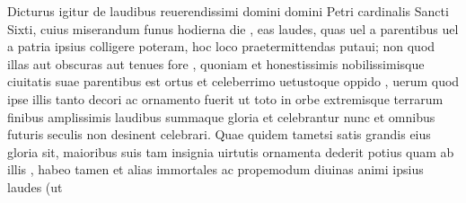 \documentclass[a5paper,twoside]{article}
\begin{document}
Dicturus igitur de laudibus reuerendissimi domini domini Petri cardinalis Sancti Sixti, cuius miserandum funus hodierna die , eas laudes, quas uel a parentibus uel a patria ipsius colligere poteram, hoc loco praetermittendas putaui; non quod illas aut obscuras aut tenues fore , quoniam et honestissimis nobilissimisque ciuitatis suae parentibus est ortus et celeberrimo uetustoque  oppido , uerum quod ipse illis tanto decori ac ornamento fuerit ut toto in orbe extremisque terrarum finibus amplissimis laudibus summaque gloria et celebrantur nunc et omnibus futuris seculis non desinent celebrari. Quae quidem tametsi satis grandis eius gloria sit,  maioribus suis tam insignia uirtutis ornamenta dederit potius quam ab illis , habeo tamen et alias immortales ac propemodum diuinas animi ipsius laudes (ut 
\end{document}
